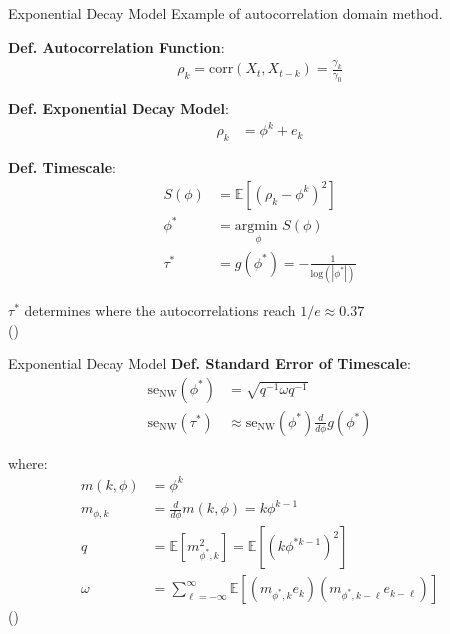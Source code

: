 \documentclass[12pt]{beamer}
\begin{document}
\begin{frame}{Exponential Decay Model}
\footnotesize
Example of autocorrelation domain method.
\vspace{0.25cm}

\textbf{Def. Autocorrelation Function}:
\begin{align}
    \rho_k = \text{corr}(X_t, X_{t-k}) = \frac{\gamma_k}{\gamma_0}
\end{align}

\textbf{Def. Exponential Decay Model}:
\begin{align} \label{eq:acf}
\rho_k &= \phi^k + e_k
\end{align}

\textbf{Def. Timescale}: 
\begin{align}
    S(\phi) &= \mathbb{E}[(\rho_k - \phi^k)^2]\\
    \phi^* &= \underset{\phi}{\text{argmin }} S(\phi)\\
    \tau^* &= g(\phi^*) = -\frac{1}{\text{log}(|\phi^*|)}
\end{align}

$\tau^*$ determines where the autocorrelations reach $1/\textit{e} \approx 0.37$\\
(\cite{murray_hierarchy_2014})

\end{frame}

\begin{frame}{Exponential Decay Model}
\footnotesize
\textbf{Def. Standard Error of Timescale}:
\begin{align}
    \text{se}_\text{NW}(\phi^*) &= \sqrt{q^{-1} \omega q^{-1}}\\
    \text{se}_\text{NW}(\tau^*) &\approx \text{se}_\text{NW}(\phi^*) \frac{d}{d\phi}g(\phi^*)
\end{align}

where:
\begin{align*}
    m(k, \phi) &= \phi^k\\
    m_{\phi, k} &= \frac{d}{d\phi} m(k, \phi) = k \phi ^{k-1}\\
    q &= \mathbb{E}[m_{\phi^*, k}^2] = \mathbb{E}[(k \phi^{*k-1})^2]\\
    \omega &= \sum_{\ell=-\infty}^{\infty} \mathbb{E}[(m_{\phi^*, k} e_{k})(m_{\phi^*, k-\ell} e_{k-\ell})]
\end{align*}
(\cite{newey_simple_1987})
\end{frame}

\end{document}
